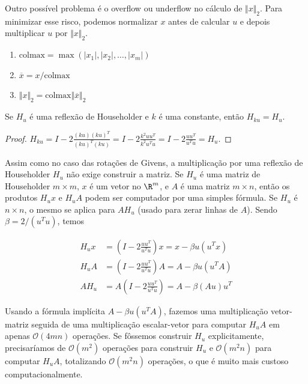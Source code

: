 \documentclass{article}
\begin{document}
Outro possível problema é o overflow ou underflow no cálculo de \(\Vert x \Vert_2\). Para minimizar esse risco, podemos normalizar \(x\) antes de calcular \(u\) e depois multiplicar \(u\) por \(\Vert x \Vert_2\).

\begin{enumerate}
    \item \(\text{colmax} = \max(|x_1|, |x_2|, \ldots, |x_m|)\)
    \item \(\overline{x} = x/\text{colmax}\)
    \item \(\Vert x \Vert_2 = \text{colmax} \Vert \overline{x} \Vert_2\)
\end{enumerate}

\begin{lem}
    Se \(H_u\) é uma reflexão de Householder e \(k\) é uma constante, então \(H_{ku} = H_u\).
\end{lem}

\begin{proof}
    \(\displaystyle H_{ku} = I - 2\frac{(ku)(ku)^T}{(ku)^T(ku)} = I - 2\frac{k^2 uu^T}{k^2 u^Tu} = I - 2\frac{uu^T}{u^Tu} = H_u\).
\end{proof}

Assim como no caso das rotações de Givens, a multiplicação por uma reflexão de Householder \(H_u\) não exige construir a matriz. Se \(H_u\) é uma matriz de Householder \(m\times m\), \(x\) é um vetor no \(\R^m\), e \(A\) é uma matriz \(m \times n\), então os produtos \(H_ux\) e \(H_uA\) podem ser computador por uma simples fórmula. Se \(H_u\) é \(n\times n\), o mesmo se aplica para \(AH_u\) (usado para zerar linhas de \(A\)). Sendo \(\beta = 2/(u^Tu)\), temos

\begin{align}
    H_ux &= \left(I - 2\frac{uu^T}{u^Tu}\right)x = x - \beta u(u^Tx) \\
    H_uA &= \left(I - 2\frac{uu^T}{u^Tu}\right)A = A - \beta u(u^TA) \\
    AH_u &= A\left(I - 2\frac{uu^T}{u^Tu}\right) = A - \beta (Au)u^T
\end{align}

Usando a fórmula implícita \(A - \beta u(u^TA)\), fazemos uma multiplicação vetor-matriz seguida de uma multiplicação escalar-vetor para computar \(H_uA\) em apenas \(\mathcal{O}(4mn)\) operações. Se fôssemos construir \(H_u\) explicitamente, precisaríamos de \(\mathcal{O}(m^2)\) operações para construir \(H_u\) e \(\mathcal{O}(m^2n)\) para computar \(H_uA\), totalizando \(\mathcal{O}(m^2n)\) operações, o que é muito mais custoso computacionalmente.
\end{document}
